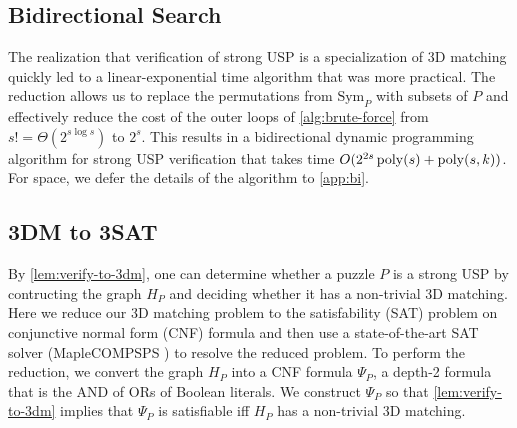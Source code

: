 \documentclass[11pt]{article}
\newcommand\Sym[1]{\ensuremath{\mathrm{Sym}_{#1}}}
\renewcommand\NP{\ensuremath{\mathsf{NP}}}
\begin{document}

\subsection{Bidirectional Search}

The realization that verification of strong USP is a specialization of
3D matching quickly led to a linear-exponential time algorithm that
was more practical.  The reduction allows us to replace the
permutations from $\Sym{P}$ with subsets of $P$ and effectively reduce
the cost of the outer loops of \autoref{alg:brute-force} from $s! =
\Theta(2^{s\log s})$ to $2^s$.  This results in a bidirectional
dynamic programming algorithm for strong USP verification that takes
time $O(2^{2s} \operatorname{poly}(s) + \operatorname{poly}(s,k))$.  For space, we defer the
details of the algorithm to \autoref{app:bi}.

\subsection{3DM to 3SAT} 
\label{subsec:sat}

By \autoref{lem:verify-to-3dm}, one can determine whether a puzzle $P$
is a strong USP by contructing the graph $H_P$ and deciding whether it
has a non-trivial 3D matching.
Here we reduce
our 3D matching problem to the satisfability (SAT) problem on conjunctive normal form (CNF) formula and
then use a state-of-the-art SAT solver (MapleCOMPSPS \cite{lgpc16}) to
resolve the reduced problem. To perform the reduction, we convert the
graph $H_P$
into a CNF formula $\Psi_P$, a depth-2 formula that is the AND
of ORs of Boolean literals.  
We construct $\Psi_P$ so that \autoref{lem:verify-to-3dm} implies that
$\Psi_P$ is satisfiable iff $H_P$ has a non-trivial 3D
  matching.
\end{document}

